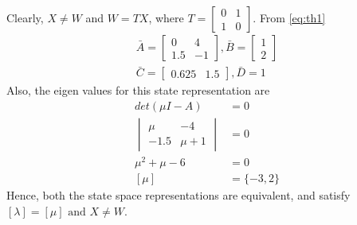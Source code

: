 \documentclass[journal,12pt,twocolumn]{IEEEtran}
\begin{document}
Clearly, $X\neq W$ and $W=TX$, where $T=\begin{bmatrix}
0 & 1\\
1 & 0
\end{bmatrix}$. From \eqref{eq:th1}
\begin{align}
    \bar A=\begin{bmatrix}
    0 & 4\\
    1.5 & -1
    \end{bmatrix},\bar B=\begin{bmatrix}
    1\\
    2
    \end{bmatrix}\\
    \bar C=\begin{bmatrix}
    0.625 & 1.5
    \end{bmatrix},\bar D=1
\end{align}
Also, the eigen values for this state representation are
\begin{align}
    det(\mu I-A)&=0\\
    \begin{vmatrix}
    \mu & -4\\
    -1.5 & \mu+1
    \end{vmatrix}&=0\\
    \mu^2+\mu-6&=0\\
    [\mu]&=\{-3,2\}
\end{align}
Hence, both the state space representations are equivalent, and satisfy $[\lambda]=[\mu] \text{ and } X\neq W$.
\end{document}
